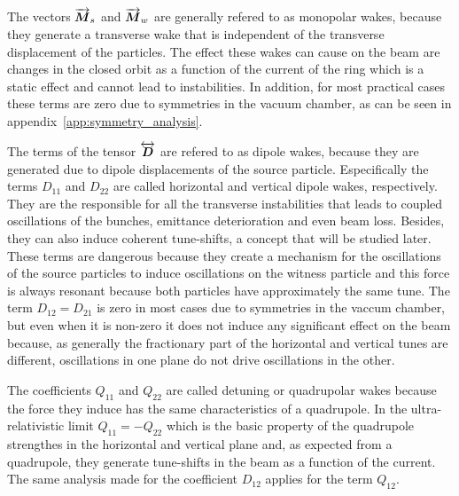 \documentclass[
	12pt,				%
	openright,			%
	oneside,			%
	a4paper,		%
	chapter=TITLE,		%
	section=TITLE,		%
    brazil,				%
	english,			%
	sumario=tradicional,
	]{abntex2}
\begin{document}
  The vectors $\overrightarrow{\boldsymbol{M}}_s$ and $\overrightarrow{\boldsymbol{M}}_w$ are generally refered to as monopolar wakes, because they generate a transverse wake that is independent of the transverse displacement of the particles. The effect these wakes can cause on the beam are changes in the closed orbit as a function of the current of the ring which is a static effect and cannot lead to instabilities. In addition, for most practical cases these terms are zero due to symmetries in the vacuum chamber, as can be seen in appendix~\ref{app:symmetry_analysis}.

  The terms of the tensor $\overleftrightarrow{\boldsymbol{D}}$ are refered to as dipole wakes, because they are generated due to dipole displacements of the source particle. Especifically the terms $D_{11}$ and $D_{22}$ are called horizontal and vertical dipole wakes, respectively. They are the responsible for all the transverse instabilities that leads to coupled oscillations of the bunches, emittance deterioration and even beam loss. Besides, they can also induce coherent tune-shifts, a concept that will be studied later. These terms are dangerous because they create a mechanism for the oscillations of the source particles to induce oscillations on the witness particle and this force is always resonant because both particles have approximately the same tune. The term $D_{12}=D_{21}$ is zero in most cases due to symmetries in the vaccum chamber, but even when it is non-zero it does not induce any significant effect on the beam because, as generally the fractionary part of the horizontal and vertical tunes are different, oscillations in one plane do not drive oscillations in the other.

  The coefficients $Q_{11}$ and $Q_{22}$ are called detuning or quadrupolar wakes because the force they induce has the same characteristics of a quadrupole. In the ultra-relativistic limit $Q_{11}=-Q_{22}$ which is the basic property of the quadrupole strengthes in the horizontal and vertical plane and, as expected from a quadrupole, they generate tune-shifts in the beam as a function of the current. The same analysis made for the coefficient $D_{12}$ applies for the term $Q_{12}$.
\end{document}
